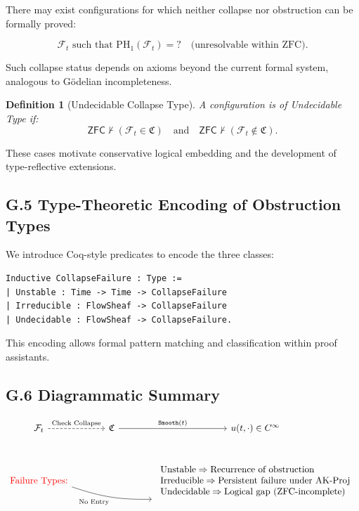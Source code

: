 \documentclass[11pt]{article}
\newtheorem{definition}[theorem]{Definition}
\begin{document}
There may exist configurations for which neither collapse nor obstruction can be formally proved:

\[
\mathcal{F}_t \text{ such that } \mathrm{PH}_1(\mathcal{F}_t) = ? \quad \text{(unresolvable within ZFC)}.
\]

Such collapse status depends on axioms beyond the current formal system, analogous to Gödelian incompleteness.

\begin{definition}[Undecidable Collapse Type]
A configuration is of \emph{Undecidable Type} if:
\[
\mathsf{ZFC} \nvdash (\mathcal{F}_t \in \mathfrak{C}) \quad \text{and} \quad \mathsf{ZFC} \nvdash (\mathcal{F}_t \notin \mathfrak{C}).
\]
\end{definition}

These cases motivate conservative logical embedding and the development of type-reflective extensions.

\subsection{G.5 Type-Theoretic Encoding of Obstruction Types}

We introduce Coq-style predicates to encode the three classes:

\begin{lstlisting}[language=Coq, caption=Collapse Failure Type Predicates]
Inductive CollapseFailure : Type :=
| Unstable : Time -> Time -> CollapseFailure
| Irreducible : FlowSheaf -> CollapseFailure
| Undecidable : FlowSheaf -> CollapseFailure.
\end{lstlisting}

This encoding allows formal pattern matching and classification within proof assistants.

\subsection{G.6 Diagrammatic Summary}

\[
\begin{tikzcd}[column sep=large, row sep=large]
\mathcal{F}_t \arrow[dashrightarrow]{r}{\text{Check Collapse}} & \mathfrak{C} \arrow[r, "\texttt{Smooth}(t)"] & u(t,\cdot) \in C^\infty \\
\textcolor{red}{\text{Failure Types:}} \arrow[rr, bend right=10, "\text{No Entry}"'] & 
& 
\begin{array}{l}
\text{Unstable} \Rightarrow \text{Recurrence of obstruction} \\
\text{Irreducible} \Rightarrow \text{Persistent failure under AK-Proj} \\
\text{Undecidable} \Rightarrow \text{Logical gap (ZFC-incomplete)}
\end{array}
\end{tikzcd}
\]
\end{document}
